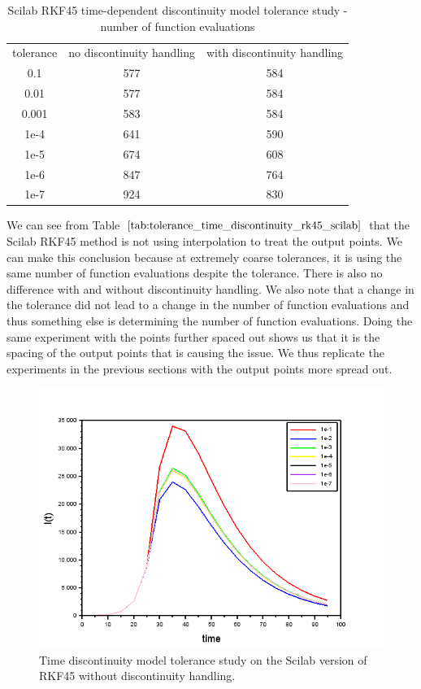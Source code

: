 \begin{table}[H]
\caption {Scilab RKF45 time-dependent discontinuity model tolerance study - number of function evaluations} 
\label{tab:tolerance_time_discontinuity_rk45_scilab} 
\begin{center}
\begin{tabular}{ c c c }
tolerance & no discontinuity handling & with discontinuity handling\\ 
0.1 & 577 & 584 \\
0.01 & 577 & 584 \\
0.001 & 583 & 584 \\
1e-4 & 641 & 590 \\
1e-5 & 674 & 608 \\
1e-6 & 847 & 764 \\
1e-7 & 924 & 830 \\
\end{tabular}
\end{center}
\end{table}
We can see from Table $\ref{tab:tolerance_time_discontinuity_rk45_scilab}$ that the Scilab RKF45 method is not using interpolation to treat the output points. We can make this conclusion because at extremely coarse tolerances, it is using the same number of function evaluations despite the tolerance. There is also no difference with and without discontinuity handling. We also note that a change in the tolerance did not lead to a change in the number of function evaluations and thus something else is determining the number of function evaluations. Doing the same experiment with the points further spaced out shows us that it is the spacing of the output points that is causing the issue. We thus replicate the experiments in the previous sections with the output points more spread out.
\begin{figure}[H]
\centering
\includegraphics[width=0.7\linewidth]{./figures/tolerance_time_rkf_further_no_event_sci}
\caption{Time discontinuity model tolerance study on the Scilab version of RKF45 without discontinuity handling.}
\label{fig:tolerance_time_rkf_further_no_event_sci}
\end{figure}

